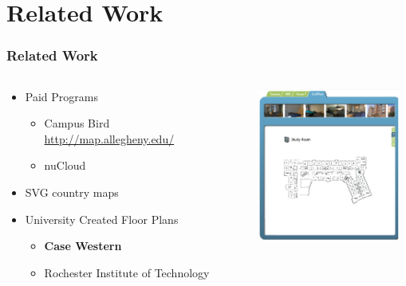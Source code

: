 \documentclass[hyperref={pdfpagelabels=false}]{beamer}
\begin{document}
\section{Related Work}
\hypertarget{Related Work}{{}}
\begin{frame}
\frametitle{Related Work}

\begin{columns}
	 \begin{column}{.5\textwidth}
\begin{itemize}[<+->]
	\item Paid Programs
	\begin{itemize}
		\item Campus Bird \url{http://map.allegheny.edu/}
		\item nuCloud
	\end{itemize}
	\item SVG country maps
	\item University Created Floor Plans
	\begin{itemize}
		\item \textbf{Case Western} 
		\item Rochester Institute of Technology
	\end{itemize}
\end{itemize}	 
\end{column}
	
 \begin{column}{.6\textwidth}
 	\centering
    \includegraphics[height=5cm, width=5.5cm]{CWRUFacilitiesTourFloorPlan.png} 
 
 \end{column}

\end{columns}
\end{frame}
\end{document}
